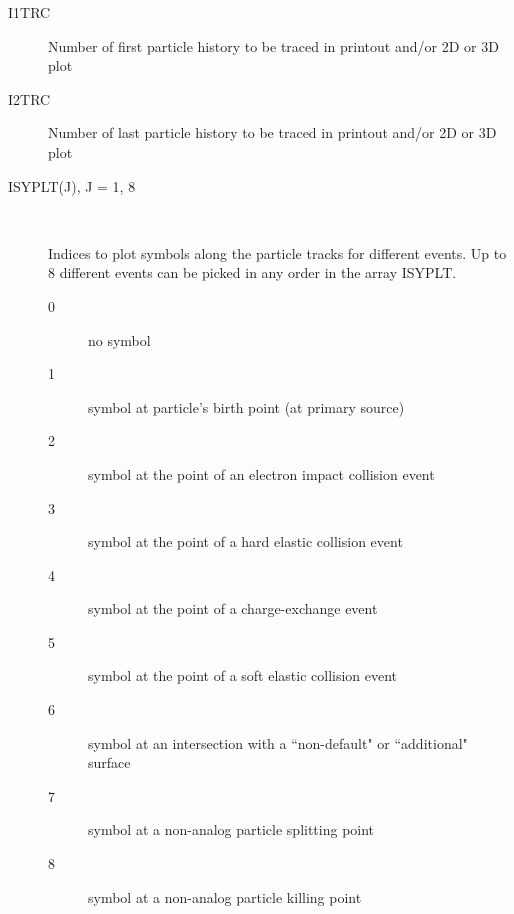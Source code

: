 \begin{description}
  \item[I1TRC] Number of first particle history to be traced in printout and/or
        2D or 3D plot
  \item[I2TRC] Number of last particle history to be traced in
        printout and/or 2D or 3D plot
  \item[ISYPLT(J), J = 1, 8] ~

        Indices to plot symbols along the particle tracks for different events.
        Up to 8 different events can be picked in any order in the array ISYPLT.
        \begin{description}
          \item[0] no symbol
          \item[1] symbol at particle's birth point (at primary
                source)
          \item[2] symbol at the point of an electron impact collision event
          \item[3] symbol at the point of a hard elastic collision event
          \item[4] symbol
                at the point of a charge-exchange event
          \item[5] symbol at the point of a soft
                elastic collision event
          \item[6] symbol at an intersection with a
                ``non-default" or ``additional" surface
          \item[7] symbol at a non-analog
                particle splitting point
          \item[8] symbol at a non-analog particle killing point


\end{description}
\end{description}
